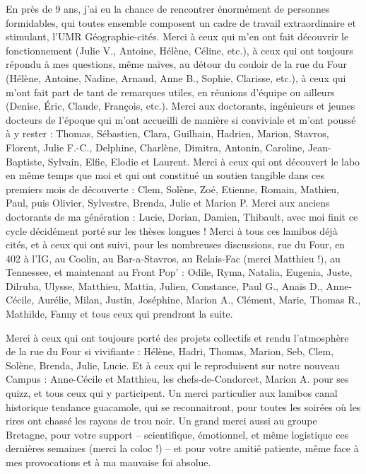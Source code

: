 En près de 9 ans, j'ai eu la chance de rencontrer énormément de personnes formidables, qui toutes ensemble composent un cadre de travail extraordinaire et stimulant, l'UMR Géographie-cités.
Merci à ceux qui m'en ont fait découvrir le fonctionnement (Julie V., Antoine, Hélène, Céline, etc.), à ceux qui ont toujours répondu à mes questions, même naïves, au détour du couloir de la rue du Four (Hélène, Antoine, Nadine, Arnaud, Anne B., Sophie, Clarisse, etc.), à ceux qui m'ont fait part de tant de remarques utiles, en réunions d'équipe ou ailleurs (Denise, Éric, Claude, François, etc.).
Merci aux doctorants, ingénieurs et jeunes docteurs de l'époque qui m'ont accueilli de manière si conviviale et m'ont poussé à y rester : Thomas, Sébastien, Clara, Guilhain, Hadrien, Marion, Stavros, Florent, Julie F.-C., Delphine, Charlène, Dimitra, Antonin, Caroline, Jean-Baptiste, Sylvain, Elfie, Elodie et Laurent.
Merci à ceux qui ont découvert le labo en même temps que moi et qui ont constitué un soutien tangible dans ces premiers mois de découverte : Clem, Solène, Zoé, Etienne, Romain, Mathieu, Paul, puis Olivier, Sylvestre, Brenda, Julie et Marion P.
Merci aux anciens doctorants de \og ma génération\fg{} : Lucie, Dorian, Damien, Thibault, avec moi finit ce cycle décidément porté sur les thèses longues !
Merci à tous ces lamibos déjà cités, et à ceux qui ont suivi, pour les nombreuses discussions, rue du Four, en 402 à l'IG, au Coolin, au Bar-a-Stavros, au Relais-Fac (merci Matthieu !), au Tennessee, et maintenant au Front Pop' : Odile, Ryma, Natalia, Eugenia, Juste, Dilruba, Ulysse, Matthieu, Mattia, Julien, Constance, Paul G., Anaïs D., Anne-Cécile, Aurélie, Milan, Justin, Joséphine, Marion A., Clément, Marie, Thomas R., Mathilde, Fanny et tous ceux qui prendront la suite.

Merci à ceux qui ont toujours porté des projets collectifs et rendu l'atmosphère de la rue du Four si vivifiante : Hélène, Hadri, Thomas, Marion, Seb, Clem, Solène, Brenda, Julie, Lucie.
Et à ceux qui le reproduisent sur notre nouveau Campus : Anne-Cécile et Matthieu, les \og chefs-de-Condorcet\fg{}, Marion A. pour ses quizz, et tous ceux qui y participent.
Un merci particulier aux lamibos canal historique tendance guacamole, qui se reconnaitront, pour toutes les soirées où les rires ont chassé les \og rayons de trou noir\fg{}.
Un grand merci aussi au groupe Bretagne, pour votre support -- scientifique, émotionnel, et même logistique ces dernières semaines (merci la coloc !) -- et pour votre amitié patiente, même face à mes provocations et à ma mauvaise foi absolue.
\clearpage

